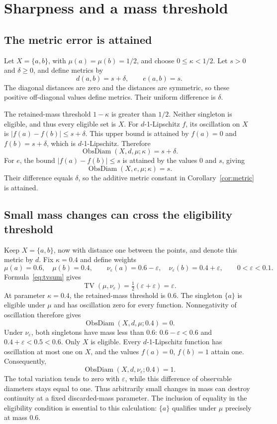 \documentclass[a4paper,11pt]{article}
\DeclareMathOperator{\ObsDiam}{ObsDiam}
\DeclareMathOperator{\TV}{TV}
\begin{document}
\section{Sharpness and a mass threshold}

\subsection{The metric error is attained}

Let $X=\{a,b\}$, with $\mu(a)=\mu(b)=1/2$, and choose
$0\le\kappa<1/2$. Let $s>0$ and $\delta\ge0$, and define metrics by
\[
 d(a,b)=s+\delta,\qquad e(a,b)=s.
\]
The diagonal distances are zero and the distances are symmetric, so
these positive off-diagonal values define metrics. Their uniform
difference is $\delta$.

The retained-mass threshold $1-\kappa$ is greater than $1/2$.
Neither singleton is eligible, and thus every eligible set is $X$.
For $d$-1-Lipschitz $f$, its oscillation on $X$ is
$|f(a)-f(b)|\le s+\delta$. This upper bound is attained by
$f(a)=0$ and $f(b)=s+\delta$, which is $d$-1-Lipschitz. Therefore
\[
 \ObsDiam(X,d,\mu;\kappa)=s+\delta.
\]
For $e$, the bound $|f(a)-f(b)|\le s$ is attained by the values
$0$ and $s$, giving
\[
 \ObsDiam(X,e,\mu;\kappa)=s.
\]
Their difference equals $\delta$, so the additive metric constant in
Corollary~\ref{cor:metric} is attained.

\subsection{Small mass changes can cross the eligibility threshold}

Keep $X=\{a,b\}$, now with distance one between the points, and denote
this metric by $d$. Fix $\kappa=0.4$ and define weights
\[
 \mu(a)=0.6,\quad\mu(b)=0.4,
 \qquad
 \nu_\varepsilon(a)=0.6-\varepsilon,\quad
 \nu_\varepsilon(b)=0.4+\varepsilon,
 \qquad 0<\varepsilon<0.1.
\]
Formula~\eqref{eq:tvsum} gives
\[
 \TV(\mu,\nu_\varepsilon)
 =\tfrac12(\varepsilon+\varepsilon)=\varepsilon.
\]
At parameter $\kappa=0.4$, the retained-mass threshold is $0.6$.
The singleton $\{a\}$ is eligible under $\mu$ and has oscillation
zero for every function. Nonnegativity of oscillation therefore gives
\[
 \ObsDiam(X,d,\mu;0.4)=0.
\]
Under $\nu_\varepsilon$, both singletons have mass less than $0.6$:
$0.6-\varepsilon<0.6$ and $0.4+\varepsilon<0.5<0.6$.
Only $X$ is eligible. Every $d$-1-Lipschitz function has oscillation
at most one on $X$, and the values $f(a)=0$, $f(b)=1$ attain one.
Consequently,
\[
 \ObsDiam(X,d,\nu_\varepsilon;0.4)=1.
\]
The total variation tends to zero with $\varepsilon$, while this
difference of observable diameters stays equal to one. Thus arbitrarily
small changes in mass can destroy continuity at a fixed discarded-mass
parameter. The inclusion of equality in the eligibility condition is
essential to this calculation: $\{a\}$ qualifies under $\mu$ precisely
at mass $0.6$.
\end{document}
